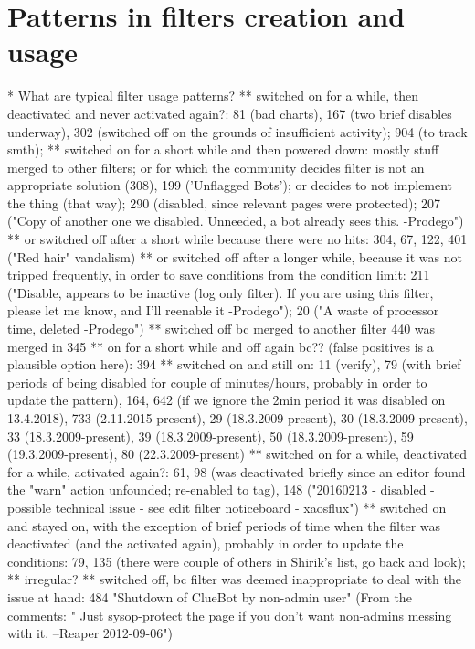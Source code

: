 \section{Patterns in filters creation and usage}
* What are typical filter usage patterns?
  ** switched on for a while, then deactivated and never activated again?: 81 (bad charts), 167 (two brief disables underway), 302 (switched off on the grounds of insufficient activity); 904 (to track smth);
     ** switched on for a short while and then powered down: mostly stuff merged to other filters; or for which the community decides filter is not an appropriate solution (308), 199 ('Unflagged Bots'); or decides to not implement the thing (that way); 290 (disabled, since relevant pages were protected); 207 ("Copy of another one we disabled. Unneeded, a bot already sees this. -Prodego")
     ** or switched off after a short while because there were no hits: 304, 67, 122, 401 ("Red hair" vandalism)
     ** or switched off after a longer while, because it was not tripped frequently, in order to save conditions from the condition limit: 211 ("Disable, appears to be inactive (log only filter). If you are using this filter, please let me know, and I'll reenable it -Prodego"); 20 ("A waste of processor time, deleted -Prodego")
     ** switched off bc merged to another filter 440 was merged in 345
     ** on for a short while and off again bc?? (false positives is a plausible option here): 394
  ** switched on and still on: 11 (verify), 79 (with brief periods of being disabled for couple of minutes/hours, probably in order to update the pattern), 164, 642 (if we ignore the 2min period it was disabled on 13.4.2018), 733 (2.11.2015-present), 29 (18.3.2009-present), 30 (18.3.2009-present), 33 (18.3.2009-present), 39 (18.3.2009-present), 50 (18.3.2009-present), 59 (19.3.2009-present), 80 (22.3.2009-present)
  ** switched on for a while, deactivated for a while, activated again?: 61, 98 (was deactivated briefly since an editor found the "warn" action unfounded; re-enabled to tag), 148 ("20160213 - disabled - possible technical issue - see edit filter noticeboard - xaosflux")
  ** switched on and stayed on, with the exception of brief periods of time when the filter was deactivated (and the activated again), probably in order to update the conditions: 79, 135 (there were couple of others in Shirik's list, go back and look);
  ** irregular?
  ** switched off, bc filter was deemed inappropriate to deal with the issue at hand: 484 "Shutdown of ClueBot by non-admin user" (From the comments: " Just sysop-protect the page if you don't want non-admins messing with it. --Reaper 2012-09-06")

